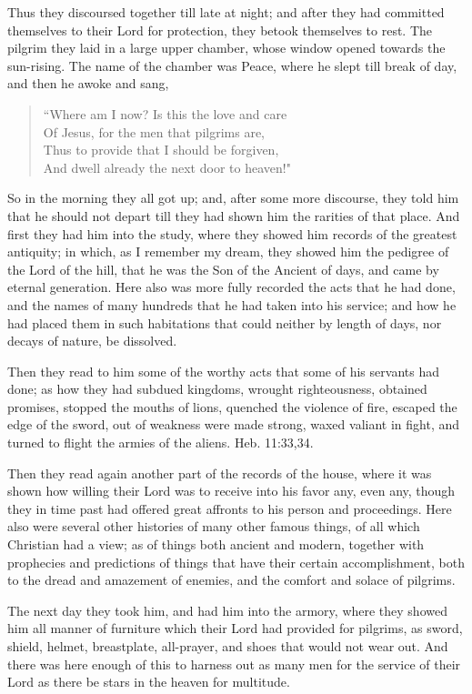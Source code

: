 Thus they discoursed together till late at night; and after they had committed themselves to their Lord for protection, they betook themselves to rest. The pilgrim they laid in a large upper chamber, whose window opened towards the sun-rising. The name of the chamber was Peace, where he slept till break of day, and then he awoke and sang,
\begin{verse}
``Where am I now? Is this the love and care\\
Of Jesus, for the men that pilgrims are,\\
Thus to provide that I should be forgiven,\\
And dwell already the next door to heaven!"\\
\end{verse}
So in the morning they all got up; and, after some more discourse, they told him that he should not depart till they had shown him the rarities of that place. And first they had him into the study, where they showed him records of the greatest antiquity; in which, as I remember my dream, they showed him the pedigree of the Lord of the hill, that he was the Son of the Ancient of days, and came by eternal generation. Here also was more fully recorded the acts that he had done, and the names of many hundreds that he had taken into his service; and how he had placed them in such habitations that could neither by length of days, nor decays of nature, be dissolved.

Then they read to him some of the worthy acts that some of his servants had done; as how they had subdued kingdoms, wrought righteousness, obtained promises, stopped the mouths of lions, quenched the violence of fire, escaped the edge of the sword, out of weakness were made strong, waxed valiant in fight, and turned to flight the armies of the aliens. Heb. 11:33,34.

Then they read again another part of the records of the house, where it was shown how willing their Lord was to receive into his favor any, even any, though they in time past had offered great affronts to his person and proceedings. Here also were several other histories of many other famous things, of all which Christian had a view; as of things both ancient and modern, together with prophecies and predictions of things that have their certain accomplishment, both to the dread and amazement of enemies, and the comfort and solace of pilgrims.

The next day they took him, and had him into the armory, where they showed him all manner of furniture which their Lord had provided for pilgrims, as sword, shield, helmet, breastplate, all-prayer, and shoes that would not wear out. And there was here enough of this to harness out as many men for the service of their Lord as there be stars in the heaven for multitude.

